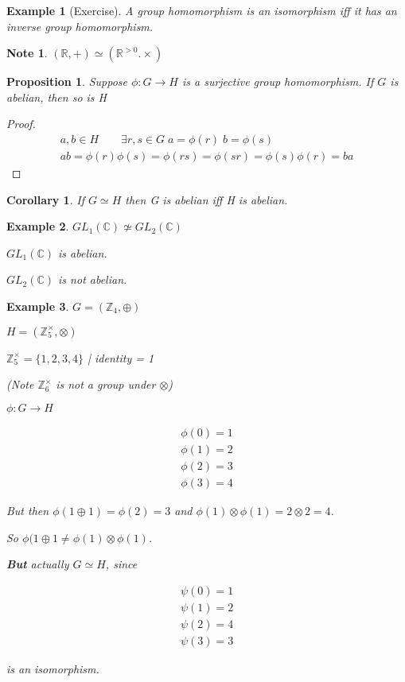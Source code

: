 \documentclass[11pt, oneside]{book}
\theoremstyle{break}
\newtheorem*{proof}{Proof}
\newtheorem{crly}{Corollary}[section]
\newtheorem{propo}{Proposition}[section]
\newtheorem*{note}{Note}
\newtheorem{eg}{Example}[section]
\newcommand{\bb}[1]{\mathbb{#1}}			%
\begin{document}
\begin{eg}[Exercise]
    A group homomorphism is an isomorphism iff it has an inverse group homomorphism.
\end{eg}

\begin{note}
    $(\bb{R}, +) \simeq (\bb{R}^{> 0}. \times)$
\end{note}

\begin{propo}\label{propo_5}
    Suppose $\phi : G \to H$ is a surjective group homomorphism. If $G$ is abelian, then so is H
\end{propo}

\begin{proof}
    \begin{gather*}
        a, b \in H \qquad \exists r, s \in G \; a = \phi(r) \; b = \phi(s) \\
        ab = \phi(r)\phi(s) = \phi(rs) = \phi(sr) = \phi(s)\phi(r) = ba
    \end{gather*}
\end{proof}

\begin{crly}
    If $G \simeq H$ then G is abelian iff H is abelian.
\end{crly}

\begin{eg}
    $GL_1(\bb{C}) \not\simeq GL_2(\bb{C})$

    $GL_1(\bb{C})$ is abelian.

    $GL_2(\bb{C})$ is not abelian.
\end{eg}

\begin{eg}
    $G = (\bb{Z}_4, \oplus)$

    $H = (\bb{Z}_5^\times, \otimes)$

    $\bb{Z}_5^\times = \{1, 2, 3, 4\}$ | identity = 1

    (Note $\bb{Z}_6^\times$ is not a group under $\otimes$)

    $\phi: G \to H$

    \begin{gather*}
        \phi(0) = 1 \\
        \phi(1) = 2 \\
        \phi(2) = 3 \\
        \phi(3) = 4
    \end{gather*}

    But then $\phi(1 \oplus 1) = \phi(2) = 3$ and $\phi(1) \otimes \phi(1) = 2 \otimes 2 = 4$.

    So $\phi(1 \oplus 1 \neq \phi(1) \otimes \phi(1)$.

    \textbf{But} actually $G \simeq H$, since

    \begin{gather*}
        \psi(0) = 1 \\
        \psi(1) = 2 \\
        \psi(2) = 4 \\
        \psi(3) = 3
    \end{gather*}

    is an isomorphism.
\end{eg}
\end{document}

